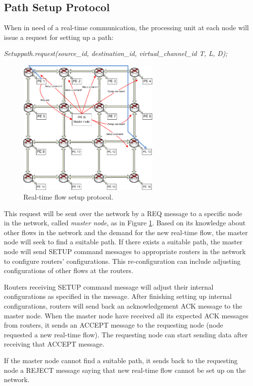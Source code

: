 \documentclass[conference, twocolumn]{IEEEtran}
\theoremstyle{definition}
\begin{document}
\subsection{Path Setup Protocol}
When in need of a real-time communication, the processing unit at each node 
will issue a request for setting up a path:

{\em Setuppath.request(source\_id, destination\_id, virtual\_channel\_id T, L,
D);}

\begin{figure}[htp]
\centering
\includegraphics[width=7cm]{pics/Protocol2}
\caption[Setup request for a real-time flow.]
{Real-time flow setup protocol.}\label{fig:ReqSetup}
\end{figure}

This request will be sent over the network by a REQ message to a specific node
in the network, called {\em master node}, as in Figure \ref{fig:ReqSetup}.
Based on its knowledge about other flows in the network and the demand for the
new real-time flow, the master node will seek to find a suitable path. If there
exists a suitable path, the master node will send SETUP command messages to
appropriate routers in the network to configure routers' configurations. This
re-configuration can include adjusting configurations of other flows at the routers.

Routers receiving SETUP command message will adjust their internal
configurations as specified in the message. After finishing setting up internal
configurations, routers will send back an acknowledgement ACK message to
the master node. When the master node have received all its expected ACK
messages from routers, it sends an ACCEPT message to the requesting node
(node requested a new real-time flow). The requesting node can start sending
data after receiving that ACCEPT message.

If the master node cannot find a suitable path, it sends back to the requesting
node a REJECT message saying that new real-time flow cannot be set up on the
network.
\end{document}
